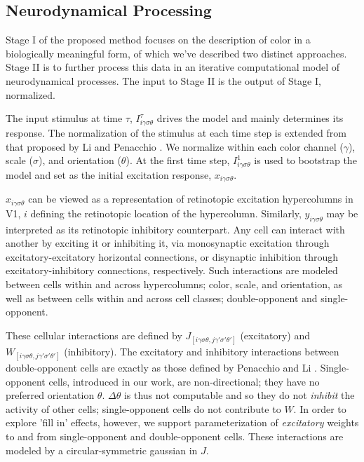 \documentclass[journal,onecolumn]{IEEEtran}
\begin{document}
\subsection*{Neurodynamical Processing}

Stage I of the proposed method focuses on the description of color in a biologically meaningful form, of which we've described two distinct approaches. Stage II is to further process this data in an iterative computational model of neurodynamical processes. The input to Stage II is the output of Stage I, normalized.

The input stimulus at time $\tau$, $I^\tau_{i\gamma\sigma\theta}$ drives the model and mainly determines its response. The normalization of the stimulus at each time step is extended from that proposed by Li \cite{li:1999} and Penacchio \cite{otazu:plosone}. We normalize within each color channel ($\gamma$), scale ($\sigma$), and orientation ($\theta$). At the first time step, $I^1_{i\gamma\sigma\theta}$ is used to bootstrap the model and set as the initial excitation response, $x_{i\gamma\sigma\theta}$.

$x_{i\gamma\sigma\theta}$ can be viewed as a representation of retinotopic excitation hypercolumns in V1, $i$ defining the retinotopic location of the hypercolumn. Similarly, $y_{i\gamma\sigma\theta}$ may be interpreted as its retinotopic inhibitory counterpart. Any cell can interact with another by exciting it or inhibiting it, via monosynaptic excitation through excitatory-excitatory horizontal connections, or disynaptic inhibition through excitatory-inhibitory connections, respectively. Such interactions are modeled between cells within and across hypercolumns; color, scale, and orientation, as well as between cells within and across cell classes; double-opponent and single-opponent.

These cellular interactions are defined by $J_{[i\gamma\sigma\theta, j\gamma'\sigma'\theta']}$ (excitatory) and $W_{[i\gamma\sigma\theta, j\gamma'\sigma'\theta']}$ (inhibitory). The excitatory and inhibitory interactions between double-opponent cells are exactly as those defined by Penacchio \cite{otazu:plosone} and Li \cite{li:1999}. Single-opponent cells, introduced in our work, are non-directional; they have no preferred orientation $\theta$. $\Delta\theta$ is thus not computable and so they do not \textit{inhibit} the activity of other cells; single-opponent cells do not contribute to $W$. In order to explore 'fill in' effects, however, we support parameterization of \textit{excitatory} weights to and from single-opponent and double-opponent cells. These interactions are modeled by a circular-symmetric gaussian in $J$.
\end{document}
